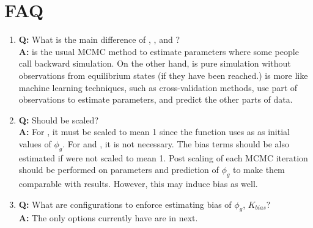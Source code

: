 
\section[FAQ]{FAQ}
\label{sec:faq}

\begin{enumerate}

\item {\bf{} Q:}
      What is the main difference of , , and
      ? \\
      {\bf\color{blue} A:}
       is the usual MCMC method to estimate parameters where
      some people call backward simulation.
      On the other hand,  is pure simulation without
      observations from equilibrium states (if they have been reached.)
       is more like machine learning techniques, such as
      cross-validation methods, use part of observations to estimate
      parameters, and predict the other parts of data.

\item {\bf\color{blue} Q:}
      Should  be scaled? \\
      {\bf\color{blue} A:}
      For , it must be scaled to mean 1 since the function uses
      as  as initial values of $\phi_g$.
      For  and , it is not necessary. The
      bias terms should be also estimated if  were not
      scaled to mean 1. Post scaling of each MCMC iteration should be
      performed on parameters and prediction of $\phi_g$ to make them
      comparable with  results. However, this may induce
      bias as well.

\item {\bf\color{blue} Q:}
      What are configurations to enforce estimating bias of $\phi_g$,
      $K_{bias}$? \\
      {\bf\color{blue} A:}
      The only options currently  have are in next.

\end{enumerate}

